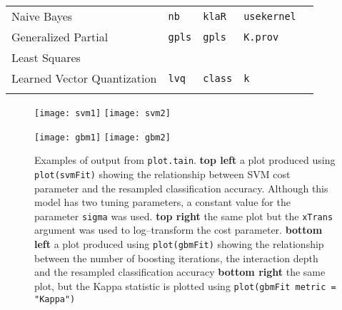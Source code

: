 \documentclass[12pt]{article}
\begin{document}
\begin{longtable}{lllll}
      Naive Bayes &
         \texttt{nb} & 
            \texttt{klaR}       & 
            \texttt{usekernel} \\
        
      Generalized Partial &
         \texttt{gpls} & 
            \texttt{gpls}       & 
            \texttt{K.prov} \\
      \:\: Least Squares \\
      
      Learned Vector Quantization &
         \texttt{lvq} & 
            \texttt{class}       &          
            \texttt{k} \\            
\label{label-name}
\end{longtable}

\begin{figure}[p]
   \begin{center}		
      \texttt{[image: svm1]}
      \hspace*{.4 in}   
      \texttt{[image: svm2]}
      
      \vspace*{.5 in}   
      
      \texttt{[image: gbm1]}
      \hspace*{.4 in}
      \texttt{[image: gbm2]}    

      \caption{ Examples of output from \texttt{plot.tain}. {\bf top left} a plot produced using \texttt{plot(svmFit)} showing the relationship between SVM cost parameter and the resampled classification accuracy. Although this model has two tuning parameters, a constant value for the parameter \texttt{sigma} was used. {\bf top right} the same plot but the \texttt{xTrans} argument was used to log--transform the cost parameter. {\bf bottom left} a plot produced using \texttt{plot(gbmFit)} showing the relationship between the number of boosting iterations, the interaction depth and the resampled classification accuracy {\bf bottom right} the same plot, but the Kappa statistic is plotted using \texttt{plot(gbmFit metric = "Kappa")}}
      \label{f:plots1} 
    \end{center}
\end{figure} 
	   
\end{document}
